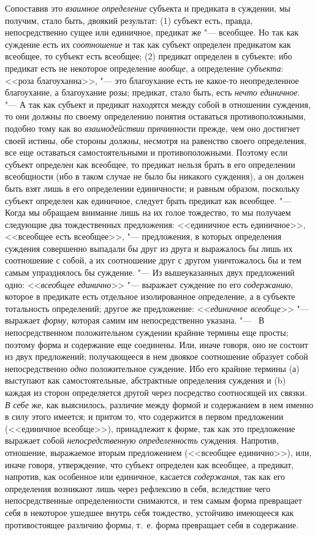 {Сопоставив это
{\em взаимное определение}
субъекта и предиката в суждении, мы получим, стало быть,
двоякий результат: (1) субъект есть, правда, непосредственно сущее или
единичное, предикат же "--- всеобщее. Но так как суждение есть
их {\em соотношение} и
так как субъект определен предикатом как всеобщее, то субъект есть
всеобщее; (2) предикат определен в субъекте; ибо предикат есть не некоторое
определение {\em вообще},
а определение
{\em субъекта}: <<роза
благоуханна>>, "--- это благоухание есть не какое-то
неопределенное благоухание, а благоухание розы; предикат, стало быть, есть
{\em нечто единичное}. "---
А так как субъект и предикат находятся между собой в
отношении суждения, то они должны по своему определению понятия оставаться
противоположными, подобно тому как во
{\em взаимодействии}
причинности прежде, чем оно достигнет своей истины, обе
стороны должны, несмотря на равенство своего определения, все еще
оставаться самостоятельными и противоположными. Поэтому если субъект
определен как всеобщее, то предикат нельзя брать в его определении
всеобщности (ибо в таком случае не было бы никакого
суждения), а он должен быть взят лишь в его определении
единичности; и равным образом, поскольку субъект определен как единичное,
следует брать предикат как всеобщее. "--- Когда мы обращаем
внимание лишь на их голое тождество, то мы получаем следующие два
тождественных предложения:\label{bkm:bm35a}
<<единичное есть единичное>>,
<<всеобщее есть всеобщее>>, "--- предложения, в
которых определения суждения совершенно выпадали бы друг из друга и
выражалось бы лишь их соотношение с собой, а их соотношение друг с другом
уничтожалось бы и тем самым упразднялось бы суждение. "--- Из
вышеуказанных двух предложений одно:
<<{\em всеобщее единично}>> "---
выражает суждение по его
{\em содержанию}, которое
в предикате есть отдельное изолированное определение, а в субъекте
тотальность определений; другое же предложение:
<<{\em единичное всеобще}>>
"--- выражает {\em форму},
которая самим им непосредственно указана. "---
\ В непосредственном положительном суждении крайние термины
еще просты; поэтому форма и содержание еще соединены. Или, иначе говоря,
оно не состоит из двух предложений; получающееся в нем двоякое соотношение
образует собой непосредственно
{\em одно} положительное
суждение. Ибо его крайние термины (а) выступают как самостоятельные,
абстрактные определения суждения и (b) каждая из сторон определяется другой
через посредство соотносящей их связки.
{\em В себе} же, как
выяснилось, различие между формой и содержанием в нем именно в силу этого
имеется; и притом то, что содержится в первом предложении (<<единичное
всеобще>>), принадлежит к форме, так как это предложение выражает собой
{\em непосредственную определенность}
суждения. Напротив, отношение, выражаемое вторым предложением
(<<всеобщее единично>>), или, иначе говоря, утверждение, что субъект
определен как всеобщее, а предикат, напротив, как особенное или единичное,
касается {\em содержания},
так как его определения возникают лишь через рефлексию в
себя, вследствие чего непосредственные определенности снимаются, и тем
самым форма превращает себя в некоторое ушедшее внутрь себя тождество,
устойчиво имеющееся как противостоящее различию формы, т.~е. форма
превращает себя в содержание.

}
